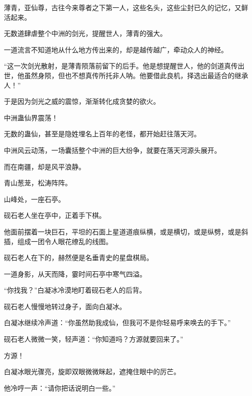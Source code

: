 \begin{this_body}
薄青，亚仙尊，古往今来尊者之下第一人，这些名头，这些尘封已久的记忆，又鲜活起来。

无数道肆虐整个中洲的剑光，提醒世人，薄青的强大。

一道流言不知道地从什么地方传出来的，却是越传越广，牵动众人的神经。

“这一次剑光散射，是薄青陨落前留下的后手。他是想提醒世人，他的剑道真传出世，他虽然身陨，但也不想真传所托非人呐。他要借此良机，择选出最适合的继承人！”

于是因为剑光之威的震惊，渐渐转化成贪婪的欲火。

中洲蛊仙界震荡！

无数的蛊仙，甚至是隐姓埋名上百年的老怪，都开始赶往落天河。

中洲风云动荡，一场囊括整个中洲的巨大纷争，就要在落天河源头展开。

而在南疆，却是风平浪静。

青山葱茏，松涛阵阵。

山峰处，一座石亭。

砚石老人坐在亭中，正着手下棋。

他面前摆着一块巨石，平坦的石面上星道道痕纵横，或是横切，或是纵劈，或是斜插，组成一团令人眼花缭乱的线图。

砚石老人在下的，赫然便是名垂青史的星盘棋局。

一道身影，从天而降，霎时间石亭中寒气四溢。

“你找我？”白凝冰冷漠地盯着砚石老人的后背。

砚石老人慢慢地转过身子，面向白凝冰。

白凝冰继续冷声道：“你虽然助我成仙，但我可不是你轻易呼来唤去的手下。”

砚石老人微微一笑，轻声道：“你知道吗？方源就要回来了。”

方源！

白凝冰眼光骤亮，旋即双眼微微眯起，遮掩住眼中的厉芒。

他冷哼一声：“请你把话说明白一些。”

\end{this_body}

